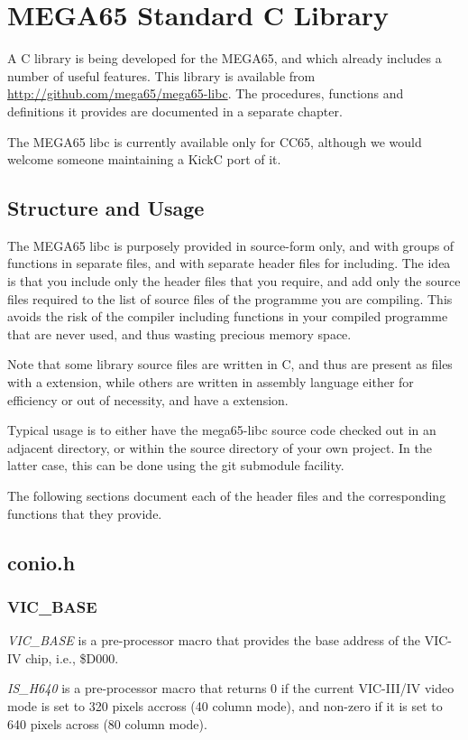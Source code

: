 \chapter{MEGA65 Standard C Library}

A C library is being developed for the MEGA65, and which already
includes a number of useful features. This library is available from
\url{http://github.com/mega65/mega65-libc}. The procedures,
functions and definitions it provides are documented in a separate
chapter.

The MEGA65 libc is currently available only for CC65, although we would
welcome someone maintaining a KickC port of it.

\section{Structure and Usage}

The MEGA65 libc is purposely provided in source-form only, and with groups
of functions in separate files, and with separate header files for including.
The idea is that you include only the header files that you require, and
add only the source files required to the list of source files of the programme
you are compiling.  This avoids the risk of the compiler including functions
in your compiled programme that are never used, and thus wasting precious memory
space.

Note that some library source files are written in C, and thus are present as
files with a  extension, while others are written in assembly language
either for efficiency or out of necessity, and have a  extension.

Typical usage is to either have the mega65-libc source code checked out in an
adjacent directory, or within the source directory of your own project.  In the
latter case, this can be done using the git submodule facility.

The following sections document each of the header files and the corresponding
functions that they provide.

\section{conio.h}

\subsection{VIC\_BASE}

{\em VIC\_BASE} is a pre-processor macro that provides the base address of the
VIC-IV chip, i.e., \$D000.

{\em IS\_H640} is a pre-processor macro that returns 0 if the current VIC-III/IV
video mode is set to 320 pixels accross (40 column mode), and non-zero if it is set to 640 pixels across (80 column mode).
